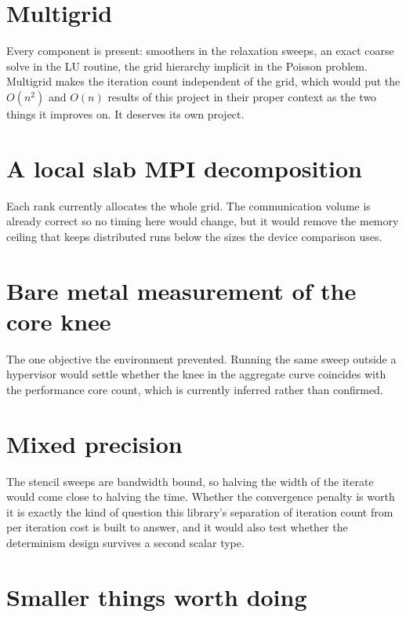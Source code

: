 \documentclass[11pt,a4paper]{report}
\begin{document}
\section{Multigrid}

Every component is present: smoothers in the relaxation sweeps, an exact coarse
solve in the LU routine, the grid hierarchy implicit in the Poisson problem.
Multigrid makes the iteration count independent of the grid, which would put the
$O(n^2)$ and $O(n)$ results of this project in their proper context as the two
things it improves on. It deserves its own project.

\section{A local slab MPI decomposition}

Each rank currently allocates the whole grid. The communication volume is already
correct so no timing here would change, but it would remove the memory ceiling
that keeps distributed runs below the sizes the device comparison uses.

\section{Bare metal measurement of the core knee}

The one objective the environment prevented. Running the same sweep outside a
hypervisor would settle whether the knee in the aggregate curve coincides with
the performance core count, which is currently inferred rather than confirmed.

\section{Mixed precision}

The stencil sweeps are bandwidth bound, so halving the width of the iterate would
come close to halving the time. Whether the convergence penalty is worth it is
exactly the kind of question this library's separation of iteration count from
per iteration cost is built to answer, and it would also test whether the
determinism design survives a second scalar type.

\section{Smaller things worth doing}
\end{document}
